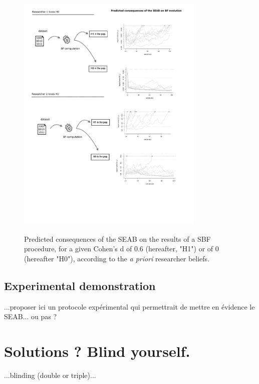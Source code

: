 \documentclass[a4paper,man,natbib,floatsintext,donotrepeattitle]{apa6}
\begin{document}
\begin{figure}[H]
  \caption{Predicted consequences of the SEAB on the results of a SBF procedure, for a given Cohen's d of 0.6 (hereafter, "H1") or of 0 (hereafter "H0"), according to the \emph{a priori} researcher beliefs.}
  \centering
  \includegraphics[width=0.8\textwidth]{figures/BFF_predictions.pdf}
  \label{fig:pred}
\end{figure}


\subsection{Experimental demonstration}

...proposer ici un protocole expérimental qui permettrait de mettre en évidence le SEAB... ou pas ?

\section{Solutions ? Blind yourself.}

...blinding (double or triple)...
\end{document}
